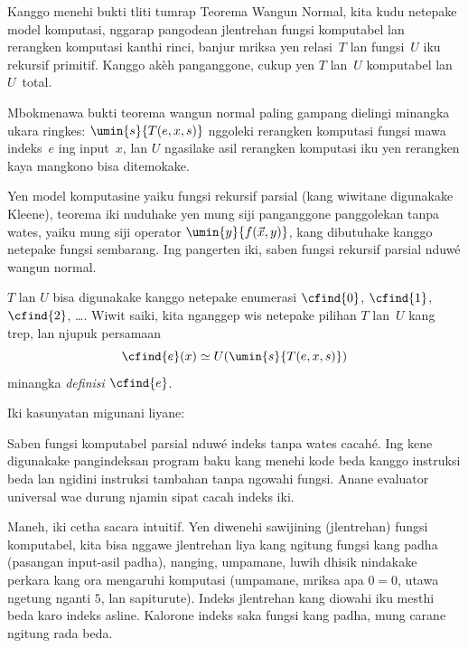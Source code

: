 \documentclass[../../../include/open-logic-section]{subfiles}
\begin{document}
\begin{explain}
Kanggo menehi bukti tliti tumrap Teorema Wangun
Normal, kita kudu netepake model komputasi,
nggarap pangodean jlentrehan fungsi komputabel
lan rerangken komputasi kanthi rinci, banjur
mriksa yen relasi~$T$ lan fungsi~$U$ iku
rekursif primitif. Kanggo akèh panganggone,
cukup yen $T$ lan~$U$ komputabel lan $U$~total.

Mbokmenawa bukti teorema wangun normal paling
gampang dielingi minangka ukara ringkes:
$\umin{s}{T(e, x, s)}$ nggoleki rerangken
komputasi fungsi mawa indeks~$e$ ing input~$x$,
lan $U$ ngasilake asil rerangken komputasi iku
yen rerangken kaya mangkono bisa ditemokake.
\end{explain}

Yen model komputasine yaiku fungsi rekursif
parsial (kang wiwitane digunakake Kleene),
teorema iki nuduhake yen mung siji panganggone
panggolekan tanpa wates, yaiku mung siji operator
$\umin{y}{f(\vec x, y)}$, kang dibutuhake
kanggo netepake fungsi sembarang. Ing pangerten
iki, saben fungsi rekursif parsial nduwé
wangun normal.

$T$ lan $U$ bisa digunakake kanggo netepake
enumerasi $\cfind{0}$, $\cfind{1}$,
$\cfind{2}$, \dots. Wiwit saiki, kita nganggep
wis netepake pilihan $T$ lan~$U$ kang trep,
lan njupuk persamaan
\[
\cfind{e}(x) \simeq U(\umin{s}{T(e,x,s)})
\]
minangka \emph{definisi} $\cfind{e}$.

Iki kasunyatan migunani liyane:

\begin{thm}
Saben fungsi komputabel parsial nduwé
indeks tanpa wates cacahé. Ing kene digunakake pangindeksan program baku kang menehi kode beda kanggo instruksi beda lan ngidini instruksi tambahan tanpa ngowahi fungsi. Anane evaluator universal wae durung njamin sipat cacah indeks iki.
\end{thm}

Maneh, iki cetha sacara intuitif. Yen diwenehi
sawijining (jlentrehan) fungsi komputabel,
kita bisa nggawe jlentrehan liya kang ngitung
fungsi kang padha (pasangan input-asil padha),
nanging, umpamane, luwih dhisik nindakake
perkara kang ora mengaruhi komputasi (umpamane,
mriksa apa $0 = 0$, utawa ngetung nganti $5$,
lan sapiturute). Indeks jlentrehan kang diowahi
iku mesthi beda karo indeks asline. Kalorone
indeks saka fungsi kang padha, mung carane
ngitung rada beda.
\end{document}
